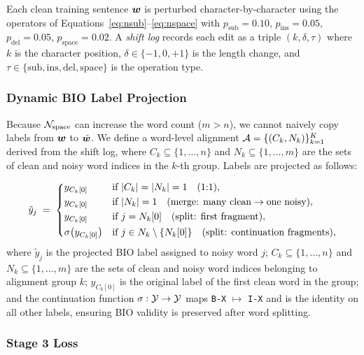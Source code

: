 Each clean training sentence $\bm{w}$ is perturbed character-by-character using
the operators of Equations~\eqref{eq:nsub}--\eqref{eq:nspace} with
$p_{\text{sub}}{=}0.10$, $p_{\text{ins}}{=}0.05$,
$p_{\text{del}}{=}0.05$, $p_{\text{space}}{=}0.02$.
A \emph{shift log} records each edit as a triple
$(k, \delta, \tau)$ where $k$ is the character position, $\delta \in \{-1,0,+1\}$
is the length change, and $\tau \in \{\text{sub},\text{ins},\text{del},\text{space}\}$
is the operation type.

\subsubsection{Dynamic BIO Label Projection}
\label{subsec:label_proj}

Because $\mathcal{N}_{\text{space}}$ can increase the word count ($m > n$), we
cannot naively copy labels from $\bm{w}$ to $\tilde{\bm{w}}$.  We define a
word-level alignment $\mathcal{A} = \{(C_k, N_k)\}_{k=1}^{K}$ derived from the
shift log, where $C_k \subseteq \{1,\ldots,n\}$ and
$N_k \subseteq \{1,\ldots,m\}$ are the sets of clean and noisy word indices
in the $k$-th group.  Labels are projected as follows:

\begin{equation}
\tilde{y}_j \;=\;
\begin{dcases}
  y_{C_k[0]}                 & \text{if } |C_k|=|N_k|=1 \quad \text{(1:1)},\\
  y_{C_k[0]}                 & \text{if } |N_k|=1 \quad \text{(merge: many clean} \to \text{one noisy)},\\
  y_{C_k[0]}                 & \text{if } j = N_k[0] \quad \text{(split: first fragment)},\\
  \sigma\!\left(y_{C_k[0]}\right) & \text{if } j \in N_k\setminus\{N_k[0]\} \quad \text{(split: continuation fragments)},
\end{dcases}
\label{eq:label_proj}
\end{equation}
\noindent where $\tilde{y}_j$ is the projected BIO label assigned to noisy word $j$; $C_k \subseteq \{1,\ldots,n\}$ and $N_k \subseteq \{1,\ldots,m\}$ are the sets of clean and noisy word indices belonging to alignment group $k$; $y_{C_k[0]}$ is the original label of the first clean word in the group; and the continuation function $\sigma : \mathcal{Y} \to \mathcal{Y}$ maps \texttt{B-X} $\mapsto$ \texttt{I-X} and is the identity on all other labels, ensuring BIO validity is preserved after word splitting.

\subsubsection{Stage 3 Loss}

